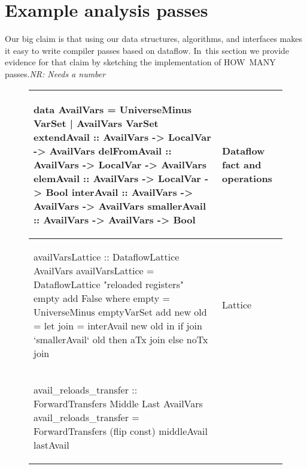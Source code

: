 \documentclass[blockstyle,preprint,nocopyrightspace]{sigplanconf}
\newcommand{\authornote}[1]{{\em #1}}
\newcommand{\norman}[1]{\authornote{NR: #1}}
\let\remark\norman
\begin{document}
\section{Example analysis passes}


Our big claim is that using our data structures, algorithms, and
interfaces makes it easy to write compiler passes based on dataflow.
In~this section we provide evidence for that claim by sketching the
implementation of HOW~MANY passes.\remark{Needs a number}

\newcommand\T{\rule{0pt}{0.6ex}}
\newcommand\B{\rule[-0.05ex]{0pt}{0pt}}
\begin{figure*}
\begin{tabular}{CL}
\T\begin{code}
data AvailVars = UniverseMinus VarSet
               | AvailVars     VarSet
extendAvail  :: AvailVars -> LocalVar  -> AvailVars
delFromAvail :: AvailVars -> LocalVar  -> AvailVars
elemAvail    :: AvailVars -> LocalVar  -> Bool
interAvail   :: AvailVars -> AvailVars -> AvailVars
smallerAvail :: AvailVars -> AvailVars -> Bool
\end{code}\B
& Dataflow fact and operations\\
\hline

\T\begin{code}
availVarsLattice :: DataflowLattice AvailVars
availVarsLattice = DataflowLattice "reloaded registers" empty add False
    where empty = UniverseMinus emptyVarSet
          add new old = let join = interAvail new old in
                        if join `smallerAvail` old then aTx join else noTx join
\end{code}\B
& Lattice\\
\hline

\T\begin{code}
avail_reloads_transfer :: ForwardTransfers Middle Last AvailVars
avail_reloads_transfer = ForwardTransfers (flip const) middleAvail lastAvail


\end{code}
\end{tabular}
\end{figure*}
\end{document}

